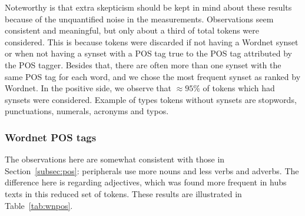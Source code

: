 Noteworthy is that extra skepticism should be kept in mind about these results
because of the unquantified noise in the measurements.
Observations seem consistent and meaningful, but only about a third of total tokens
were considered.
This is because tokens were discarded if not having a Wordnet synset
or when not having a synset with a POS tag true to the POS tag attributed by the POS tagger.
Besides that, there are often more than one synset with the same POS tag for each word,
and we chose the most frequent synset as ranked by Wordnet.
In the positive side, we observe that $\approx 95\%$ of tokens which had synsets
were considered.
Example of types tokens without synsets are stopwords, punctuations, numerals, acronyms and typos.


\subsubsection{Wordnet POS tags}\label{subsec:wnpos}
The observations here are somewhat consistent with those in Section~\ref{subsec:pos}:
peripherals use more nouns and less verbs and adverbs.
The difference here is regarding adjectives, which was found more frequent in hubs texts
in this reduced set of tokens.
These results are illustrated in Table~\ref{tab:wnpos}.



